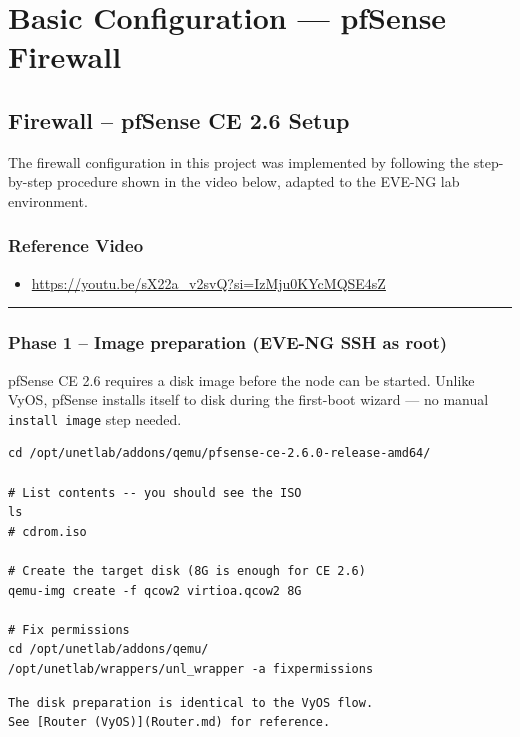 \chapter{Basic Configuration --- pfSense Firewall}

\section{Firewall -- pfSense CE 2.6 Setup}

The firewall configuration in this project was implemented by following the step-by-step procedure shown in the video below, adapted to the EVE-NG lab environment.

\subsection{Reference Video}

\begin{itemize}
\tightlist
\item
  \url{https://youtu.be/sX22a_v2svQ?si=IzMju0KYcMQSE4sZ}
\end{itemize}

\begin{center}\rule{0.5\linewidth}{0.5pt}\end{center}

\subsection{Phase 1 -- Image preparation (EVE-NG SSH as root)}

pfSense CE 2.6 requires a disk image before the node can be started. Unlike VyOS, pfSense installs itself to disk during the first-boot wizard --- no manual \texttt{install\ image} step needed.

\begin{lstlisting}
cd /opt/unetlab/addons/qemu/pfsense-ce-2.6.0-release-amd64/

# List contents -- you should see the ISO
ls
# cdrom.iso

# Create the target disk (8G is enough for CE 2.6)
qemu-img create -f qcow2 virtioa.qcow2 8G

# Fix permissions
cd /opt/unetlab/addons/qemu/
/opt/unetlab/wrappers/unl_wrapper -a fixpermissions
\end{lstlisting}

\begin{lstlisting}
The disk preparation is identical to the VyOS flow.
See [Router (VyOS)](Router.md) for reference.
\end{lstlisting}

